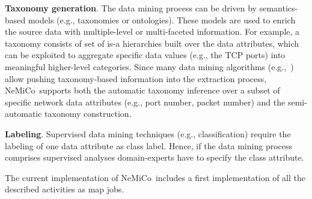 \documentclass[conference]{IEEEtran}
\newcommand{\Nemico}{{\sc NeMiCo}}
\newcommand{\comment}[1]{}
\begin{document}
\textbf{Taxonomy generation}. The data mining process can be driven by semantics-based models (e.g., taxonomies or ontologies). These models are used to enrich the source data with multiple-level or multi-faceted information.  
For example, a taxonomy consists of set of is-a hierarchies built over the data attributes, which can be exploited to aggregate specific data values (e.g., the TCP ports) into meaningful higher-level categories.
Since many data mining algorithms (e.g.,~\cite{ISPA14}) allow pushing taxonomy-based information into the extraction process, \Nemico\ supports both
the automatic taxonomy inference over a subset of specific network data attributes (e.g., port number, packet number) 
and the semi-automatic taxonomy construction. 

\textbf{Labeling}. Supervised data mining techniques (e.g., classification) require the labeling of one data attribute 
as class label. Hence, if the data mining process comprises supervised analyses domain-experts have to specify the class attribute. 


The current implementation of \Nemico\ includes a first implementation of all the described activities as map jobs.



\comment{The current implementation of \Nemico\ includes the implementation of both data discretization and conversion which are performed by a single map only job. Each record is processed by the map
function and, if the number of packets is above the threshold (e.g., 10 packets), the corresponding discretized version is generated as output of the mapping step.
This task entails an inherently parallel elaboration, considering that can be applied independently to each record.}



\end{document}
